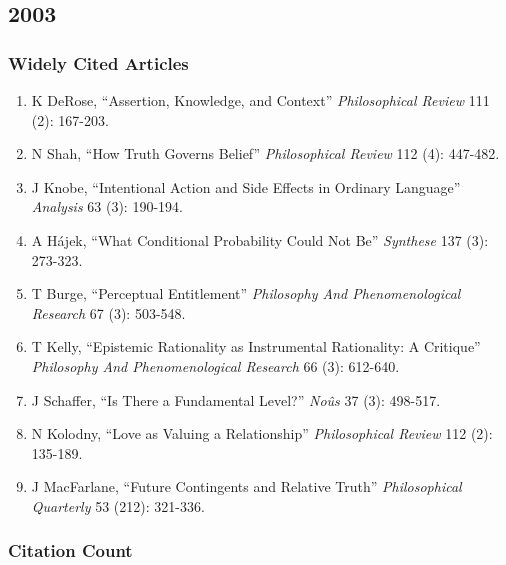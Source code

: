 \documentclass[
  10pt,
  letterpaper,
  DIV=11,
  numbers=noendperiod,
  twoside]{scrartcl}
\providecommand{\tightlist}{%
  \setlength{\itemsep}{0pt}\setlength{\parskip}{0pt}}\usepackage{longtable,booktabs,array}
\begin{document}
\newpage

\subsection{2003}\label{section-27}

\subsubsection*{Widely Cited Articles}\label{widely-cited-articles-27}

\begin{enumerate}
\def\labelenumi{\arabic{enumi}.}
\tightlist
\item
  K DeRose, ``Assertion, Knowledge, and Context'' \emph{Philosophical
  Review} 111 (2): 167-203.
\item
  N Shah, ``How Truth Governs Belief'' \emph{Philosophical Review} 112
  (4): 447-482.
\item
  J Knobe, ``Intentional Action and Side Effects in Ordinary Language''
  \emph{Analysis} 63 (3): 190-194.
\item
  A Hájek, ``What Conditional Probability Could Not Be'' \emph{Synthese}
  137 (3): 273-323.
\item
  T Burge, ``Perceptual Entitlement'' \emph{Philosophy And
  Phenomenological Research} 67 (3): 503-548.
\item
  T Kelly, ``Epistemic Rationality as Instrumental Rationality: A
  Critique'' \emph{Philosophy And Phenomenological Research} 66 (3):
  612-640.
\item
  J Schaffer, ``Is There a Fundamental Level?'' \emph{Noûs} 37 (3):
  498-517.
\item
  N Kolodny, ``Love as Valuing a Relationship'' \emph{Philosophical
  Review} 112 (2): 135-189.
\item
  J MacFarlane, ``Future Contingents and Relative Truth''
  \emph{Philosophical Quarterly} 53 (212): 321-336.
\end{enumerate}

\subsubsection*{Citation Count}\label{citation-count-27}
\end{document}
